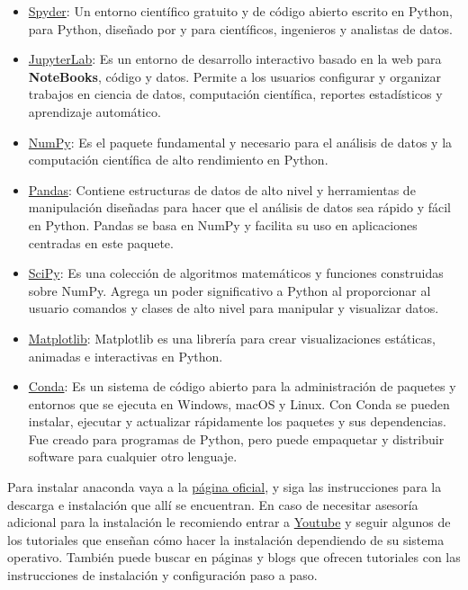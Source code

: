 \documentclass[
]{book}
\theoremstyle{definition}
\theoremstyle{definition}
\theoremstyle{definition}
\theoremstyle{definition}
\theoremstyle{remark}
\begin{document}
\begin{itemize}
\item
  \href{https://www.spyder-ide.org}{Spyder}: Un entorno científico gratuito y de código abierto escrito en Python, para Python, diseñado por y para científicos, ingenieros y analistas de datos.
\item
  \href{https://jupyter.org}{JupyterLab}: Es un entorno de desarrollo interactivo basado en la web para \textbf{NoteBooks}, código y datos. Permite a los usuarios configurar y organizar trabajos en ciencia de datos, computación científica, reportes estadísticos y aprendizaje automático.
\item
  \href{https://numpy.org}{NumPy}: \citep{harris2020array} Es el paquete fundamental y necesario para el análisis de datos y la computación científica de alto rendimiento en Python.
\item
  \href{https://pandas.pydata.org/docs/getting_started/index.html}{Pandas}: \citep{mckinney2010data} Contiene estructuras de datos de alto nivel y herramientas de manipulación diseñadas para hacer que el análisis de datos sea rápido y fácil en Python. Pandas se basa en NumPy y facilita su uso en aplicaciones centradas en este paquete.\\
\item
  \href{https://scipy.org}{SciPy}: Es una colección de algoritmos matemáticos y funciones construidas sobre NumPy. Agrega un poder significativo a Python al proporcionar al usuario comandos y clases de alto nivel para manipular y visualizar datos.
\item
  \href{https://matplotlib.org}{Matplotlib}: Matplotlib es una librería para crear visualizaciones estáticas, animadas e interactivas en Python.
\item
  \href{https://docs.conda.io/projects/conda/en/latest/\#}{Conda}: Es un sistema de código abierto para la administración de paquetes y entornos que se ejecuta en Windows, macOS y Linux. Con Conda se pueden instalar, ejecutar y actualizar rápidamente los paquetes y sus dependencias. Fue creado para programas de Python, pero puede empaquetar y distribuir software para cualquier otro lenguaje.
\end{itemize}

Para instalar anaconda vaya a la \href{https://www.anaconda.com/products/individual}{página oficial}, y siga las instrucciones para la descarga e instalación que allí se encuentran. En caso de necesitar asesoría adicional para la instalación le recomiendo entrar a \href{https://www.youtube.com/results?search_query=instalar+anaconda+python+2021}{Youtube} y seguir algunos de los tutoriales que enseñan cómo hacer la instalación dependiendo de su sistema operativo. También puede buscar en páginas y blogs que ofrecen tutoriales con las instrucciones de instalación y configuración paso a paso.
\end{document}
